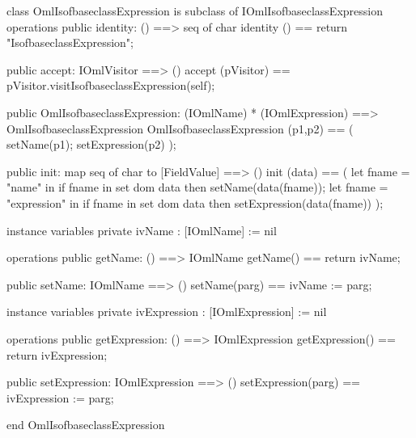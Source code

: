 \begin{vdm_al}
class OmlIsofbaseclassExpression is subclass of IOmlIsofbaseclassExpression
operations
  public identity: () ==> seq of char
  identity () == return "IsofbaseclassExpression";

  public accept: IOmlVisitor ==> ()
  accept (pVisitor) == pVisitor.visitIsofbaseclassExpression(self);

  public OmlIsofbaseclassExpression:
      (IOmlName) *
      (IOmlExpression) ==> OmlIsofbaseclassExpression
  OmlIsofbaseclassExpression (p1,p2) == 
   ( setName(p1);
     setExpression(p2) );

  public init: map seq of char to [FieldValue] ==> ()
  init (data) ==
    ( let fname = "name" in
        if fname in set dom data
        then setName(data(fname));
      let fname = "expression" in
        if fname in set dom data
        then setExpression(data(fname)) );

instance variables
  private ivName : [IOmlName] := nil

operations
  public getName: () ==> IOmlName
  getName() == return ivName;

  public setName: IOmlName ==> ()
  setName(parg) == ivName := parg;

instance variables
  private ivExpression : [IOmlExpression] := nil

operations
  public getExpression: () ==> IOmlExpression
  getExpression() == return ivExpression;

  public setExpression: IOmlExpression ==> ()
  setExpression(parg) == ivExpression := parg;

end OmlIsofbaseclassExpression
\end{vdm_al}

